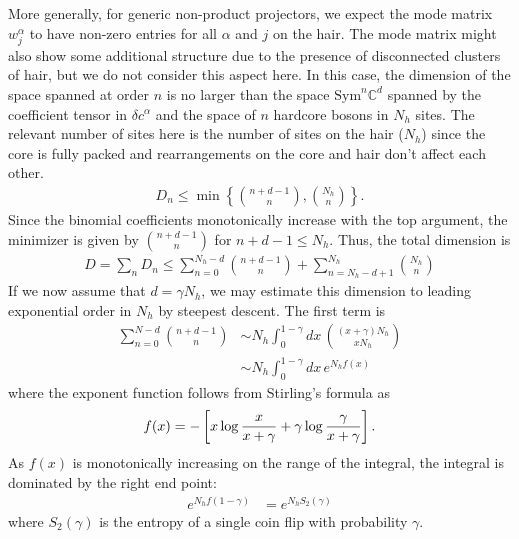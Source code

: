 \documentclass[aps,pra,twocolumn,superscriptaddress,amsmath]{revtex4-1}
\newcommand{\f}[2]{{\ensuremath{\mathchoice%
       {\dfrac{#1}{#2}}
       {\dfrac{#1}{#2}}
       {\frac{#1}{#2}}
       {\frac{#1}{#2}}
       }}}
\newcommand{\Set}[1]{\left\{ #1 \right\}}
\begin{document}
More generally, for generic non-product projectors, we expect the mode matrix  $w^\alpha_j$ to have non-zero entries for all $\alpha$ and $j$ on the hair. The mode matrix might also show some additional structure due to the presence of disconnected clusters of hair, but we do not consider this aspect here. In this case, the dimension of the space spanned at order $n$ is no larger than the space $\mathrm{Sym}^n \mathbb{C}^d$ spanned by the coefficient tensor in $\delta c^\alpha$ and the space of $n$ hardcore bosons in $N_{h}$ sites. The relevant number of sites here is the number of sites on the hair ($N_{h}$) since the core is fully packed and rearrangements on the core and hair don't affect each other.
\begin{align}
	D_n \le \min\Set{\binom{n+d-1}{n}, \binom{N_{h}}{n}}.
\end{align}
Since the binomial coefficients monotonically increase with the top argument, the minimizer is given by $\binom{n+d-1}{n}$ for $n+d-1 \le N_{h}$. 
Thus, the total dimension is 
\begin{align}
	D = \sum_n D_n \le \sum_{n=0}^{N_{h}-d}\binom{n+d-1}{n} + \sum_{n=N_{h}-d+1}^{N_{h}} \binom{N_{h}}{n}
\end{align}
If we now assume that $d = \gamma N_{h}$, we may estimate this dimension to leading exponential order in $N_{h}$ by steepest descent. The first term is
\begin{align}
	\sum_{n=0}^{N-d}\binom{n+d-1}{n} &\sim N_{h} \int_0^{1-\gamma} dx\, \binom{(x+\gamma)N_{h}}{xN_{h}} \nonumber \\
	&\sim N_{h} \int_0^{1-\gamma} dx\, e^{N_{h} f(x)}
\end{align}
where the exponent function follows from Stirling's formula as
\begin{align}
	f(x) = -\left[ x\log\f{x}{x+\gamma} + \gamma \log \f{\gamma}{x+\gamma} \right].
\end{align}
As $f(x)$ is monotonically increasing on the range of the integral, the integral is dominated by the right end point:
\begin{align}
	e^{N_{h} f(1-\gamma)} &= e^{N_{h} S_2(\gamma)}
\end{align}
where $S_2(\gamma)$ is the entropy of a single coin flip with probability $\gamma$.
\end{document}
